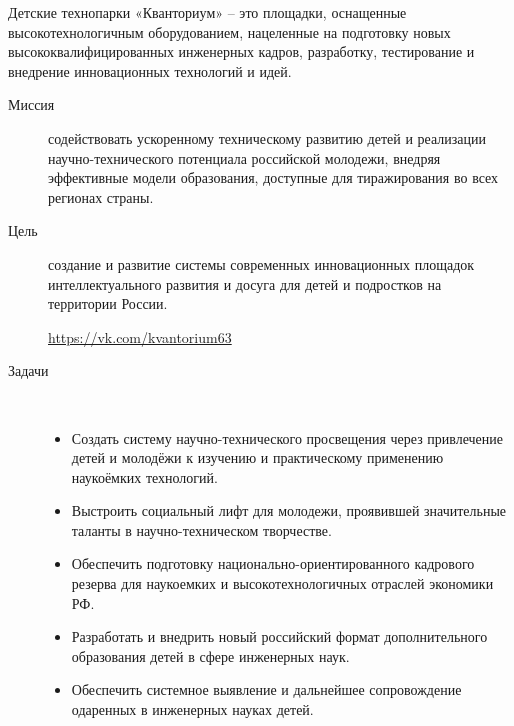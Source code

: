 \clearpage{}


\noindent
Детские технопарки «Кванториум» – это площадки, оснащенные высокотехнологичным
оборудованием, нацеленные на подготовку новых высококвалифицированных инженерных
кадров, разработку, тестирование и внедрение инновационных технологий и идей.

\clearpage

\begin{description}

\item[Миссия] содействовать ускоренному техническому развитию детей и реализации
научно-технического потенциала российской молодежи, внедряя эффективные модели
образования, доступные для тиражирования во всех регионах страны.

\item[Цель] создание и развитие системы современных инновационных площадок
интеллектуального развития и досуга для детей и подростков на территории России.

\bigskip
\url{https://vk.com/kvantorium63}

\clearpage
\item[Задачи]\ \\

\begin{itemize}[nosep]
  \item 
Создать систему научно-технического просвещения через привлечение детей и
молодёжи к изучению и практическому применению наукоёмких технологий.
  \item 
Выстроить социальный лифт для молодежи, проявившей значительные таланты в
научно-техническом творчестве.
  \item 
Обеспечить подготовку национально-ориентированного кадрового резерва для
наукоемких и высокотехнологичных отраслей экономики РФ.
  \item 
Разработать и внедрить новый российский формат дополнительного образования детей
в сфере инженерных наук.
  \item 
Обеспечить системное выявление и дальнейшее сопровождение одаренных в инженерных
науках детей.
\end{itemize}
 
\end{description}



